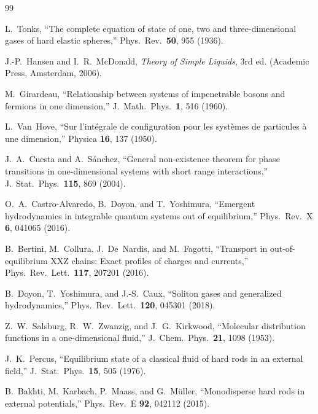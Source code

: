 \documentclass[aps,pre,twocolumn,superscriptaddress,longbibliography,floatfix]{revtex4-2}
\begin{document}
\begin{thebibliography}{99}

L.~Tonks,
``The complete equation of state of one, two and three-dimensional gases of hard elastic spheres,''
Phys.\ Rev.\ \textbf{50}, 955 (1936).

J.-P.~Hansen and I.~R.~McDonald,
\emph{Theory of Simple Liquids}, 3rd ed. (Academic Press, Amsterdam, 2006).

M.~Girardeau,
``Relationship between systems of impenetrable bosons and fermions in one dimension,''
J.\ Math.\ Phys.\ \textbf{1}, 516 (1960).

L.~Van~Hove,
``Sur l'int\'egrale de configuration pour les syst\`emes de particules \`a une dimension,''
Physica \textbf{16}, 137 (1950).

J.~A.~Cuesta and A.~S\'anchez,
``General non-existence theorem for phase transitions in one-dimensional systems with short range interactions,''
J.\ Stat.\ Phys.\ \textbf{115}, 869 (2004).

O.~A.~Castro-Alvaredo, B.~Doyon, and T.~Yoshimura,
``Emergent hydrodynamics in integrable quantum systems out of equilibrium,''
Phys.\ Rev.\ X \textbf{6}, 041065 (2016).

B.~Bertini, M.~Collura, J.~De~Nardis, and M.~Fagotti,
``Transport in out-of-equilibrium XXZ chains: Exact profiles of charges and currents,''
Phys.\ Rev.\ Lett.\ \textbf{117}, 207201 (2016).

B.~Doyon, T.~Yoshimura, and J.-S.~Caux,
``Soliton gases and generalized hydrodynamics,''
Phys.\ Rev.\ Lett.\ \textbf{120}, 045301 (2018).

Z.~W.~Salsburg, R.~W.~Zwanzig, and J.~G.~Kirkwood,
``Molecular distribution functions in a one-dimensional fluid,''
J.\ Chem.\ Phys.\ \textbf{21}, 1098 (1953).

J.~K.~Percus,
``Equilibrium state of a classical fluid of hard rods in an external field,''
J.\ Stat.\ Phys.\ \textbf{15}, 505 (1976).

B.~Bakhti, M.~Karbach, P.~Maass, and G.~M\"uller,
``Monodisperse hard rods in external potentials,''
Phys.\ Rev.\ E \textbf{92}, 042112 (2015).


\end{thebibliography}
\end{document}
